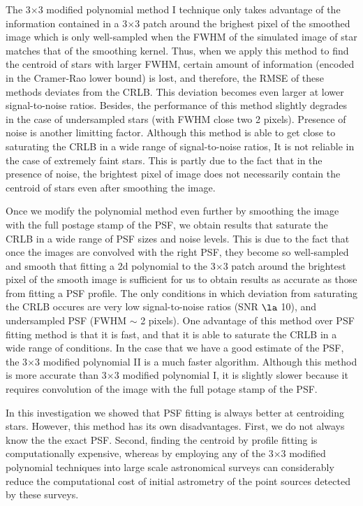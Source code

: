 \documentclass[12pt, preprint]{aastex}
\begin{document}
The 3$\times$3 modified polynomial method I technique only takes advantage of the information
 contained in a 3$\times$3 patch around the brighest pixel of the smoothed image which is only
 well-sampled when the FWHM of the simulated image of star
 matches that of the smoothing kernel. Thus, when we apply 
this method to find the centroid of stars with larger FWHM, certain amount of
information (encoded in the Cramer-Rao lower bound) is lost, and therefore, the RMSE
of these methods deviates from the CRLB. This deviation becomes even larger at lower
signal-to-noise ratios. Besides, the performance of this method slightly degrades
in the case of undersampled stars (with FWHM close two 2 pixels). 
Presence of noise is another limitting factor.
Although this method is able to get close to saturating the CRLB in a wide range of
signal-to-noise ratios, It is not reliable in the case of extremely faint stars.
 This is partly due to the fact that in the presence of noise, 
the brightest pixel of image does not necessarily contain the centroid of stars even after smoothing 
the image.

Once we modify the polynomial method even further by smoothing the image with the full postage stamp
of the PSF, we obtain results that saturate the CRLB in a wide range of PSF sizes and noise levels.  
This is due to the fact that once the images are convolved with the right PSF, they become so well-sampled and smooth
that fitting a 2d polynomial to the 3$\times$3 patch around the brightest pixel of the smooth image is sufficient for us to obtain
results as accurate as those from fitting a PSF profile. The only conditions in which deviation from
saturating the CRLB occures are very low signal-to-noise ratios (SNR $\la$ 10), and undersampled PSF (FWHM $\sim$ 2 pixels).
One advantage of this method over PSF fitting method is that it is fast, and that it is able to saturate the CRLB in 
a wide range of conditions. In the case that we have a good estimate of the PSF, the 
3$\times$3 modified polynomial II is a much faster algorithm. 
Although this method is more accurate than 3$\times$3 modified polynomial I, it is
slightly slower because it requires convolution of the image with the full potage stamp of the PSF. 

In this investigation we showed that PSF fitting is always better at centroiding stars.
However, this method has its own disadvantages. First, we do not always know the the exact PSF. Second, finding
 the centroid by profile fitting is computationally expensive, whereas by employing any of the 3$\times$3 modified polynomial 
techniques into large scale astronomical surveys can considerably reduce the computational cost
of initial astrometry of the point sources detected by these surveys. 
\end{document}
